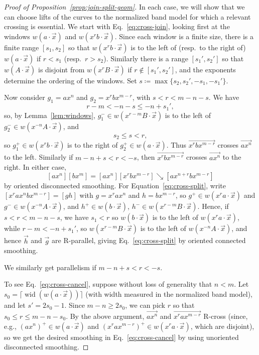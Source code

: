 \documentclass[10pt,a4paper]{amsart}
\newcommand{\ora}[1]{\overrightarrow{#1}}
\newcommand{\reducesto}{\mathrel{\searrow}}
\newcommand{\wid}{\operatorname{wid}}
\begin{document}
\begin{proof}[Proof of Proposition~\ref{prop:join-split-geom}]
  In each case, we will show that we can choose lifts of the curves to
  the normalized band model for which a
  relevant crossing is essential. We start with
  Eq.~\eqref{eq:cross-join}, looking first at the windows $w(a\cdot
  \ora{x})$ and $w(x^rb\cdot\ora{x})$.
  Since each window is a
  finite size, there is a finite range $[s_1,s_2]$ so that $w(x^rb\cdot\ora{x})$
  is to the left of (resp.~to the right of) $w(a\cdot\ora{x})$ if $r < s_1$
  (resp.\ $r > s_2$).
  Similarly there
  is a range $[s_1',s_2']$ so that $w(A\cdot\ora{x})$ is disjoint from
  $w(x^rB\cdot\ora{x})$ if $r \notin [s_1',s_2']$, and the exponents determine the
  ordering of the windows. Set
  $s \coloneqq \max\{s_2,s_2',-s_1,-s_1'\}$.

  Now consider
  $g_1 = ax^n$ and $g_2 = x^rbx^{m-r}$, with $s < r < m-n-s$. We have
  \[
    r-m < -n-s \le -n+s_1',
  \]
  so, by Lemma~\ref{lem:windows}, $g_1^- \in w(x^{r-m}B\cdot\ora{x})$
  is to the left of $g_2^- \in w(x^{-n}A\cdot\ora{x})$, and
  \[
    s_2 \le s < r,
  \]
  so $g_1^+ \in w(x^rb\cdot\ora{x})$ is to the right of $g_2^+ \in
  w(a\cdot\ora{x})$. Thus
  $\ora{x^rbx^{m-r}}$ crosses $\ora{ax^n}$ to the left. Similarly if
  $m-n+s < r < -s$, then $\ora{x^rbx^{m-r}}$ crosses $\ora{ax^n}$ to the
  right. In either case,
  \[
    [ax^n][bx^m] = [ax^n][x^r bx^{m-r}] \reducesto [ax^{n+r}bx^{m-r}]
  \]
  by oriented disconnected smoothing.
  For Equation~\eqref{eq:cross-split}, write $[x^r ax^n bx^{m-r}]=[gh]$ with
  $g=x^r ax^n$ and $h=bx^{m-r}$, 
  so $g^+ \in w(x^ra\cdot\ora{x})$ and $g^- \in w(x^{-n}A \cdot \ora{x})$, and $h^+ \in w(b \cdot \ora{x})$, $h^- \in w(x^{r-m} B \cdot \ora{x})$.
  Hence, if $s < r < m-n-s$, we have $s_1 < r$
  so $w(b\cdot\ora{x})$ is to the left of $w(x^r a\cdot\ora{x})$,
  while $r-m < -n+s_1'$, so $w(x^{r-m}B \cdot\ora{x})$ is to the left
  of $w(x^{-n}A\cdot\ora{x})$, and hence $\ora{h}$ and $\ora{g}$ are R-parallel, giving Eq.~\eqref{eq:cross-split} by oriented connected smoothing.
  
  We similarly get parallelism if $m-n+s < r < -s$.

  To see Eq.~\eqref{eq:cross-cancel}, suppose without loss of generality
  that $n < m$. Let $s_0 = \lceil \wid(w(a\cdot\ora{x})) \rceil$
  (with width measured in the normalized band model),
  and
  let $s' = 2s_0 - 1$. Since $m-n \ge 2s_0$, we can pick $r$ so that
  $s_0 \le r \le m-n-s_0$. By the above argument, $\ora{ax^n}$ and
  $\ora{x^rax^{m-r}}$ R-cross (since, e.g., $(ax^n)^+ \in w(a\cdot\ora{x})$ and
  $(x^rax^{m-r})^+ \in w(x^r a\cdot\ora{x})$, which are disjoint), so we get the
  desired smoothing in Eq.~\eqref{eq:cross-cancel} by using unoriented
  disconnected smoothing.


\end{proof}
\end{document}
